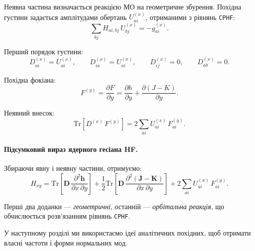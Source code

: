 Неявна частина визначається реакцією МО на геометричне збурення.
Похідна густини задається амплітудами обертань $U_{ai}^{(x)}$, отриманими
з рівнянь \texttt{CPHF}:
\begin{equation}\label{eq:HF_Hessian_CPHF}
	\sum_{bj}
	H_{ai,bj}\,U^{(x)}_{bj}
	=
	-g^{(x)}_{ai}.
\end{equation}

Перший порядок густини:
\begin{equation}
	D^{(x)}_{ai}=U^{(x)}_{ai},\qquad
	D^{(x)}_{ia}=U^{(x)}_{ai},\qquad
	D^{(x)}_{ij}=0,\qquad
	D^{(x)}_{ab}=0.
\end{equation}

Похідна фокіана:
\begin{equation}
	F^{(y)}=\frac{\partial F}{\partial y}
	=
	\frac{\partial h}{\partial y}
	+
	\frac{\partial (J-K)}{\partial y}.
\end{equation}

Неявний внесок:
\begin{equation}\label{eq:HF_Hessian_implicit}
	\mathrm{Tr}\!\left[
	D^{(x)}\,F^{(y)}
	\right]
	=
	2\sum_{ai}
	U^{(x)}_{ai}\,
	F^{(y)}_{ai}.
\end{equation}

\paragraph{Підсумковий вираз ядерного гесіана HF.}

Збираючи явну і неявну частини, отримуємо:
\begin{equation}\label{eq:HF_Hessian_final}
	H_{xy}
	=
	\mathrm{Tr}\!\left[
		\mathbf D\,\frac{\partial^2 \mathbf h}{\partial x\,\partial y}
		\right]
	+
	\frac12
	\mathrm{Tr}\!\left[
		\mathbf D\,\frac{\partial^2 (\mathbf J-\mathbf K)}{\partial x\,\partial y}
		\right]
	+
	2\sum_{ai}
	U^{(x)}_{ai}\,
	F^{(y)}_{ai}.
\end{equation}

Перші два доданки --- \emph{геометричні}, останній — \emph{орбітальна реакція},
що обчислюється розв’язанням рівнянь \texttt{CPHF}.


У наступному розділі ми використаємо ідеї аналітичних похідних,
щоб отримати власні частоти і форми нормальних мод.




